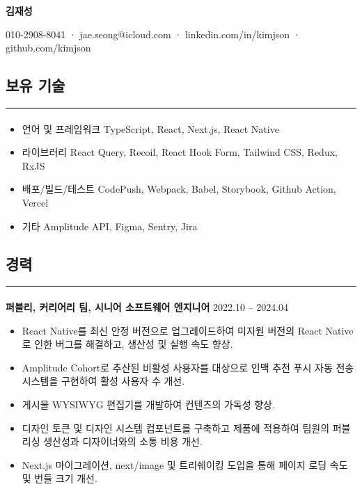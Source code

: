 \documentclass{article}
\begin{document}
\begin{center}
    \huge\textbf{김재성}
\end{center}

\begin{center}
    010-2908-8041 · jae.seong@icloud.com · linkedin.com/in/kimjson · github.com/kimjson
\end{center}

\begin{center}
    \section*{보유 기술}
\end{center}
\hrule
\paragraph{}
\begin{itemize}
    \setlength\itemsep{0.1em}
    \item 언어 및 프레임워크 \hspace{1em} TypeScript, React, Next.js, React Native
    \item 라이브러리 \hspace{4.1em} React Query, Recoil, React Hook Form, Tailwind CSS, Redux, RxJS
    \item 배포/빌드/테스트 \hspace{1.3em} CodePush, Webpack, Babel, Storybook, Github Action, Vercel
    \item 기타 \hspace{6.7em} Amplitude API, Figma, Sentry, Jira
\end{itemize}

\begin{center}
    \section*{경력}
\end{center}
\hrule
\paragraph{\newline \newline}
\textbf{퍼블리, 커리어리 팀, 시니어 소프트웨어 엔지니어} \hfill 2022.10 -- 2024.04
\begin{itemize}
    \setlength\itemsep{0.1em}
    \item React Native를 최신 안정 버전으로 업그레이드하여 미지원 버전의 React Native로 인한 버그를 해결하고, 생산성 및 실행 속도 향상.
    \item Amplitude Cohort로 추산된 비활성 사용자를 대상으로 인맥 추천 푸시 자동 전송 시스템을 구현하여 활성 사용자 수 개선.
    \item 게시물 WYSIWYG 편집기를 개발하여 컨텐츠의 가독성 향상.
    \item 디자인 토큰 및 디자인 시스템 컴포넌트를 구축하고 제품에 적용하여 팀원의 퍼블리싱 생산성과 디자이너와의 소통 비용 개선.
    \item Next.js 마이그레이션, next/image 및 트리쉐이킹 도입을 통해 페이지 로딩 속도 및 번들 크기 개선.
\end{itemize}
\end{document}
